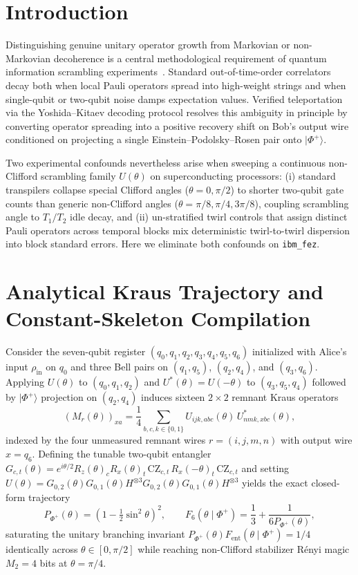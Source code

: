 \documentclass[aps,prx,twocolumn,superscriptaddress,nofootinbib]{revtex4-2}
\begin{document}
\section{Introduction}
Distinguishing genuine unitary operator growth from Markovian or non-Markovian decoherence is a central methodological requirement of quantum information scrambling experiments~\cite{YoshidaKitaev2017,LandsmanFiggatt2019}. Standard out-of-time-order correlators decay both when local Pauli operators spread into high-weight strings and when single-qubit or two-qubit noise damps expectation values. Verified teleportation via the Yoshida--Kitaev decoding protocol resolves this ambiguity in principle by converting operator spreading into a positive recovery shift on Bob's output wire conditioned on projecting a single Einstein--Podolsky--Rosen pair onto $|\Phi^+\rangle$.

Two experimental confounds nevertheless arise when sweeping a continuous non-Clifford scrambling family $U(\theta)$ on superconducting processors: (i) standard transpilers collapse special Clifford angles ($\theta = 0, \pi/2$) to shorter two-qubit gate counts than generic non-Clifford angles ($\theta = \pi/8, \pi/4, 3\pi/8$), coupling scrambling angle to $T_1/T_2$ idle decay, and (ii) un-stratified twirl controls that assign distinct Pauli operators across temporal blocks mix deterministic twirl-to-twirl dispersion into block standard errors. Here we eliminate both confounds on \texttt{ibm\_fez}.

\section{Analytical Kraus Trajectory and Constant-Skeleton Compilation}
Consider the seven-qubit register $(q_0, q_1, q_2, q_3, q_4, q_5, q_6)$ initialized with Alice's input $\rho_{\mathrm{in}}$ on $q_0$ and three Bell pairs on $(q_1, q_5)$, $(q_2, q_4)$, and $(q_3, q_6)$. Applying $U(\theta)$ to $(q_0, q_1, q_2)$ and $U^*(\theta) = U(-\theta)$ to $(q_3, q_5, q_4)$ followed by $|\Phi^+\rangle$ projection on $(q_2, q_4)$ induces sixteen $2\times 2$ remnant Kraus operators
\begin{equation}
  (M_r(\theta))_{xa} = \frac{1}{4}\sum_{b,c,k \in \{0,1\}} U_{ijk,abc}(\theta)\,U^*_{nmk,xbc}(\theta),
\end{equation}
indexed by the four unmeasured remnant wires $r = (i,j,m,n)$ with output wire $x = q_6$. Defining the tunable two-qubit entangler $G_{c,t}(\theta) = e^{i\theta/2} R_z(\theta)_c R_x(\theta)_t \,\mathrm{CZ}_{c,t}\, R_x(-\theta)_t \,\mathrm{CZ}_{c,t}$ and setting $U(\theta) = G_{0,2}(\theta)G_{0,1}(\theta)H^{\otimes 3}G_{0,2}(\theta)G_{0,1}(\theta)H^{\otimes 3}$ yields the exact closed-form trajectory
\begin{equation}
  P_{\Phi^+}(\theta) = \left(1 - \tfrac{1}{2}\sin^2\theta\right)^2, \qquad
  F_6(\theta \mid \Phi^+) = \frac{1}{3} + \frac{1}{6 P_{\Phi^+}(\theta)},
\end{equation}
saturating the unitary branching invariant $P_{\Phi^+}(\theta)F_{\mathrm{ent}}(\theta \mid \Phi^+) = 1/4$ identically across $\theta \in [0, \pi/2]$ while reaching non-Clifford stabilizer R\'enyi magic $M_2 = 4$ bits at $\theta = \pi/4$.
\end{document}
